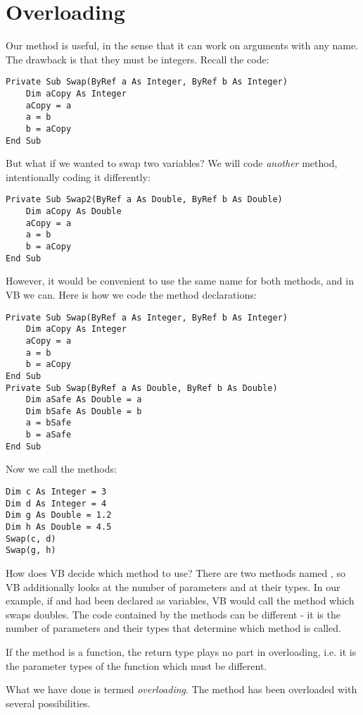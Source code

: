 	\section{Overloading}
		Our  method is useful, in the sense that it can work on arguments with any name. The drawback is that they must be integers. Recall the code:
		\begin{lstlisting}
Private Sub Swap(ByRef a As Integer, ByRef b As Integer)
	Dim aCopy As Integer
	aCopy = a
	a = b
	b = aCopy
End Sub
		\end{lstlisting}
		But what if we wanted to swap two  variables? We will code \emph{another}  method, intentionally coding it differently:
		\begin{lstlisting}
Private Sub Swap2(ByRef a As Double, ByRef b As Double)
	Dim aCopy As Double
	aCopy = a
	a = b
	b = aCopy
End Sub
		\end{lstlisting}
		However, it would be convenient to use the same name for both methods, and in VB we can. Here is how we code the method declarations:
		\begin{lstlisting}
Private Sub Swap(ByRef a As Integer, ByRef b As Integer)
	Dim aCopy As Integer
	aCopy = a
	a = b
	b = aCopy
End Sub
Private Sub Swap(ByRef a As Double, ByRef b As Double)
	Dim aSafe As Double = a
	Dim bSafe As Double = b
	a = bSafe
	b = aSafe
End Sub
		\end{lstlisting}

		Now we call the methods:
		\begin{lstlisting}
Dim c As Integer = 3
Dim d As Integer = 4
Dim g As Double = 1.2
Dim h As Double = 4.5
Swap(c, d)
Swap(g, h)
		\end{lstlisting}
		How does VB decide which method to use? There are two methods named , so VB additionally looks at the number of parameters and at their types. In our example, if  and  had been declared as  variables, VB would call the method which swaps doubles. The code contained by the methods can be different - it is the number of parameters and their types that determine which method is called.
		
		If the method is a function, the return type plays no part in overloading, i.e. it is the parameter types of the function which must be different.
		
		What we have done is termed \emph{overloading}. The  method has been overloaded with several possibilities.
		
